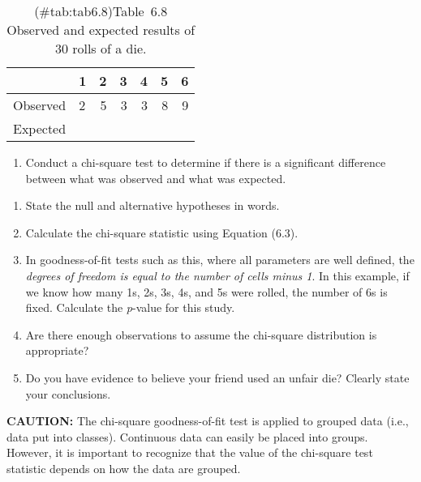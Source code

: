 \documentclass[
]{report}
\providecommand{\tightlist}{%
  \setlength{\itemsep}{0pt}\setlength{\parskip}{0pt}}
\begin{document}
\begin{table}[!h]
\centering
\caption{(\#tab:tab6.8)Table~6.8 Observed and expected results of 30 rolls of a die.}
\centering
\begin{tabular}[t]{llrrrrr}
\toprule
  & 1 & 2 & 3 & 4 & 5 & 6\\
\midrule
Observed & 2 & 5 & 3 & 3 & 8 & 9\\
Expected &  &  &  &  &  & \\
\bottomrule
\end{tabular}
\end{table}

\begin{enumerate}
\def\labelenumi{\arabic{enumi}.}
\setcounter{enumi}{33}
\tightlist
\item
  Conduct a chi-square test to determine if there is a significant difference between what was observed and what was expected.\\
\end{enumerate}

\begin{enumerate}
\def\labelenumi{\alph{enumi}.}
\tightlist
\item
  State the null and alternative hypotheses in words.\\
\item
  Calculate the chi-square statistic using Equation (6.3).\\
\item
  In goodness-of-fit tests such as this, where all parameters are well defined, the \emph{degrees of freedom is equal to the number of cells minus 1}. In this example, if we know how many 1s, 2s, 3s, 4s, and 5s were rolled, the number of 6s is fixed. Calculate the \emph{p}-value for this study.\\
\item
  Are there enough observations to assume the chi-square distribution is appropriate?\\
\item
  Do you have evidence to believe your friend used an unfair die? Clearly state your conclusions.
\end{enumerate}

\large

\textbf{CAUTION:}
The chi-square goodness-of-fit test is applied to grouped data (i.e., data put into classes). Continuous data can easily be placed into groups. However, it is important to recognize that the value of the chi-square test statistic depends on how the data are grouped.
\normalsize
\end{document}

